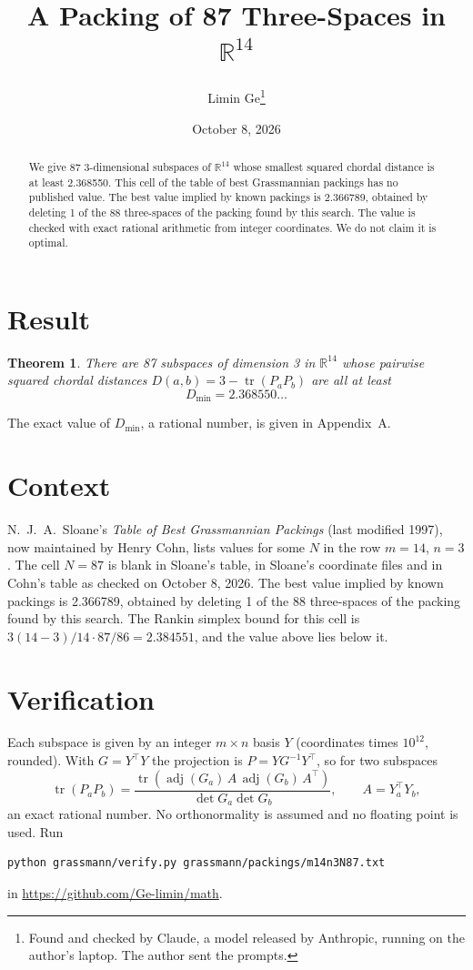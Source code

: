 \documentclass[11pt,a4paper]{article}
\title{A Packing of 87 Three-Spaces in $\mathbb{R}^{14}$}
\author{Limin Ge\thanks{Found and checked by Claude, a model released by Anthropic, running on the author's laptop. The author sent the prompts.}}
\date{October 8, 2026}
\newtheorem*{theorem}{Theorem}
\begin{document}
\maketitle
\begin{abstract}
We give 87 3-dimensional subspaces of $\mathbb{R}^{14}$ whose smallest squared chordal distance is at least 2.368550. This cell of the table of best Grassmannian packings has no published value. The best value implied by known packings is 2.366789, obtained by deleting 1 of the 88 three-spaces of the packing found by this search. The value is checked with exact rational arithmetic from integer coordinates. We do not claim it is optimal.
\end{abstract}

\section{Result}
\begin{theorem}
There are 87 subspaces of dimension 3 in $\mathbb{R}^{14}$ whose pairwise squared chordal distances $D(a,b) = 3 - \operatorname{tr}(P_aP_b)$ are all at least
\[ D_{\min} = 2.368550\ldots \]
\end{theorem}
The exact value of $D_{\min}$, a rational number, is given in Appendix~A.


\section{Context}
N.~J.~A.~Sloane's \emph{Table of Best Grassmannian Packings} (last modified 1997), now maintained by Henry Cohn, lists values for some $N$ in the row $m=14$, $n=3$. The cell $N=87$ is blank in Sloane's table, in Sloane's coordinate files and in Cohn's table as checked on October 8, 2026. The best value implied by known packings is 2.366789, obtained by deleting 1 of the 88 three-spaces of the packing found by this search. The Rankin simplex bound for this cell is $3(14-3)/14\cdot 87/86 = 2.384551$, and the value above lies below it.


\section{Verification}
Each subspace is given by an integer $m\times n$ basis $Y$ (coordinates times $10^{12}$, rounded). With $G=Y^\top Y$ the projection is $P=YG^{-1}Y^\top$, so for two subspaces
\[ \operatorname{tr}(P_aP_b)=\frac{\operatorname{tr}(\operatorname{adj}(G_a)\,A\,\operatorname{adj}(G_b)\,A^\top)}{\det G_a\det G_b},\qquad A=Y_a^\top Y_b, \]
an exact rational number. No orthonormality is assumed and no floating point is used. Run
\begin{verbatim}
python grassmann/verify.py grassmann/packings/m14n3N87.txt
\end{verbatim}
in \url{https://github.com/Ge-limin/math}.
\end{document}
